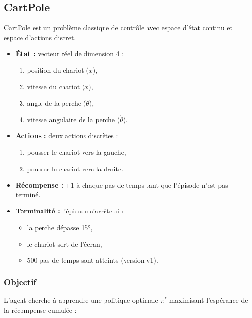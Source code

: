 \subsection{CartPole}

CartPole est un problème classique de contrôle avec espace d'état continu et espace d'actions discret.

\begin{itemize}
    \item[] \textbf{État :} vecteur réel de dimension 4 :
    \begin{enumerate}
        \item position du chariot ($x$),
        \item vitesse du chariot ($\dot{x}$),
        \item angle de la perche ($\theta$),
        \item vitesse angulaire de la perche ($\dot{\theta}$).
    \end{enumerate}

    \item[] \textbf{Actions :} deux actions discrètes :
    \begin{enumerate}
        \item pousser le chariot vers la gauche,
        \item pousser le chariot vers la droite.
    \end{enumerate}

    \item[] \textbf{Récompense :} +1 à chaque pas de temps tant que l'épisode n'est pas terminé.

    \item[] \textbf{Terminalité :} l'épisode s'arrête si :
    \begin{itemize}
        \item[] la perche dépasse 15°,
        \item[] le chariot sort de l'écran,
        \item[] 500 pas de temps sont atteints (version v1).
    \end{itemize}
\end{itemize}

\subsubsection{Objectif}

L'agent cherche à apprendre une politique optimale $\pi^*$ maximisant l'espérance de la récompense cumulée :

